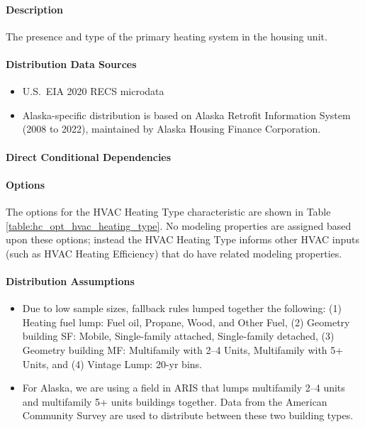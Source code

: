 \paragraph{Description}
% 
The presence and type of the primary heating system in the housing unit.

\paragraph{Distribution Data Sources}
% 
\begin{itemize}
    \item U.S.~EIA 2020 RECS microdata 
    \item Alaska-specific distribution is based on Alaska Retrofit Information System (2008 to 2022), maintained by Alaska Housing Finance Corporation.
\end{itemize}

\paragraph{Direct Conditional Dependencies}


\paragraph{Options}
The options for the HVAC Heating Type characteristic are shown in Table \ref{table:hc_opt_hvac_heating_type}. No modeling properties are assigned based upon these options; instead the HVAC Heating Type informs other HVAC inputs (such as HVAC Heating Efficiency) that do have related modeling properties.



\paragraph{Distribution Assumptions}
% 
\begin{itemize}
    \item Due to low sample sizes, fallback rules lumped together the following: (1) Heating fuel lump: Fuel oil, Propane, Wood, and Other Fuel, (2) Geometry building SF: Mobile, Single-family attached, Single-family detached, (3) Geometry building MF: Multifamily with 2--4 Units, Multifamily with 5+ Units, and (4) Vintage Lump: 20-yr bins.
    \item For Alaska, we are using a field in ARIS that lumps multifamily 2--4 units and multifamily 5+ units buildings together. Data from the American Community Survey are used to distribute between these two building types.
\end{itemize}
